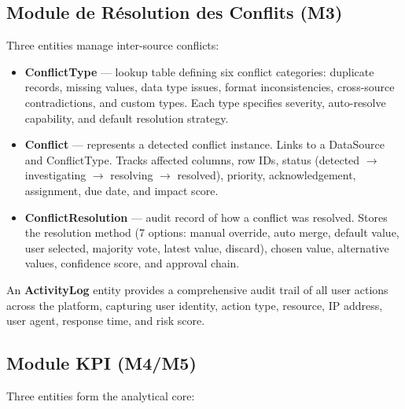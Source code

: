 \subsection{Module de Résolution des Conflits (M3)}

\noindent
Three entities manage inter-source conflicts:

\begin{itemize}
  \item \textbf{ConflictType} — lookup table defining
        six conflict categories: duplicate records,
        missing values, data type issues,
        format inconsistencies, cross-source contradictions,
        and custom types. Each type specifies
        severity, auto-resolve capability,
        and default resolution strategy.
  \item \textbf{Conflict} — represents a detected conflict
        instance. Links to a DataSource and ConflictType.
        Tracks affected columns, row IDs,
        status (detected $\rightarrow$ investigating
        $\rightarrow$ resolving $\rightarrow$ resolved),
        priority, acknowledgement, assignment,
        due date, and impact score.
  \item \textbf{ConflictResolution} — audit record
        of how a conflict was resolved.
        Stores the resolution method (7 options:
        manual override, auto merge, default value,
        user selected, majority vote, latest value,
        discard), chosen value, alternative values,
        confidence score, and approval chain.
\end{itemize}

\noindent
An \textbf{ActivityLog} entity provides a comprehensive
audit trail of all user actions across the platform,
capturing user identity, action type, resource,
IP address, user agent, response time,
and risk score.

\subsection{Module KPI (M4/M5)}

\noindent
Three entities form the analytical core:

